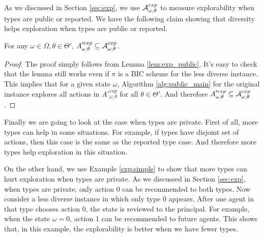 As we discussed in Section \ref{sec:exp}, we use $\mathcal{A}^{exp}_{\omega,\theta}$ to measure explorability when types are public or reported. We have the following claim showing that diversity helps exploration when types are public or reported.

\begin{claim}
For any $\omega \in \varOmega, \theta \in \varTheta'$, $A'^{exp}_{\omega,\theta} \subseteq \mathcal{A}^{exp}_{\omega,\theta}$. 
\end{claim}

\begin{proof}
The proof simply follows from Lemma \ref{lem:exp_public}. It's easy to check that the lemma still works even if $\pi$ is a BIC scheme for the less diverse instance. This implies that for a given state $\omega$, Algorithm \ref{alg:public_main} for the original instance explores all actions in $A'^{exp}_{\omega,\theta}$ for all $\theta \in \varTheta'$. And therefore $A'^{exp}_{\omega,\theta} \subseteq \mathcal{A}^{exp}_{\omega,\theta}$.
\end{proof}

Finally we are going to look at the case when types are private. First of all, more types can help in some situations. For example, if types have disjoint set of actions, then this case is the same as the reported type case. And therefore more types help exploration in this situation. 

On the other hand, we use Example \ref{exp:simple} to show that more types can hurt exploration when types are private. As we discussed in Section \ref{sec:exp}, when types are private, only action 0 can be recommended to both types. Now consider a less diverse instance in which only type 0 appears. After one agent in that type chooses action 0, the state is reviewed to the principal. For example, when the state $\omega = 0$, action $1$ can be recommended to future agents. This shows that,  in this example, the explorability is better when we have fewer types. 